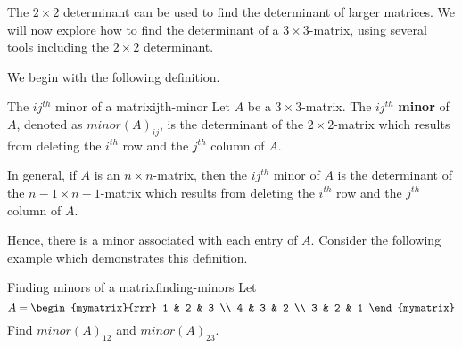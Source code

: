 The $2 \times 2$ determinant can be used to find the determinant of larger matrices.
We will now explore how to find the determinant of a $3 \times 3$-matrix, using several tools
including the $2 \times 2$ determinant.

We begin with the following definition. 

\begin{definition}{The $ij^{th}$ minor of a matrix}{ijth-minor}
Let $A$ be a $3\times 3$-matrix. The $ij^{th}$ \textbf{minor} of $A$, denoted as $minor(A) _{ij}$, is the determinant
of the $2\times 2$-matrix which results from deleting the $i^{th}$ row and
the $j^{th}$ column of $A$.

In general, if $A$ is an $n\times n$-matrix, then the $ij^{th}$ minor of $A$ is the determinant of the $n-1 \times n-1$-matrix which results from deleting the $i^{th}$ row and the $j^{th}$ column of $A$. 
\end{definition}

Hence, there is a minor associated with each entry of $A$. Consider the following example which demonstrates this definition. 

\begin{example}{Finding minors of a matrix}{finding-minors}
Let 
\begin{equation*}
A = \begin{mymatrix}{rrr}
1 & 2 & 3 \\
4 & 3 & 2 \\
3 & 2 & 1
\end{mymatrix} 
\end{equation*}
Find $minor(A) _{12}$ and $minor(A) _{23}$.
\end{example}

